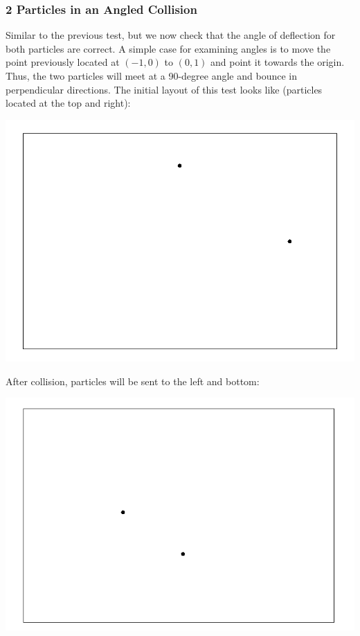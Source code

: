\documentclass{article}
\begin{document}
\subsubsection{2 Particles in an Angled Collision}
Similar to the previous test, but we now check that the angle of deflection for both particles are correct.
A simple case for examining angles is to move the point previously located at $(-1,0)$ to $(0,1)$ and point it towards the origin.
Thus, the two particles will meet at a 90-degree angle and bounce in perpendicular directions.
The initial layout of this test looks like (particles located at the top and right):
\\
\begin{center}
    \includegraphics[scale=0.5]{uncharged_2_2D_start}
\end{center}

After collision, particles will be sent to the left and bottom:
\\
\begin{center}
    \includegraphics[scale=0.5]{uncharged_2_2D_after}
\end{center}
\end{document}
